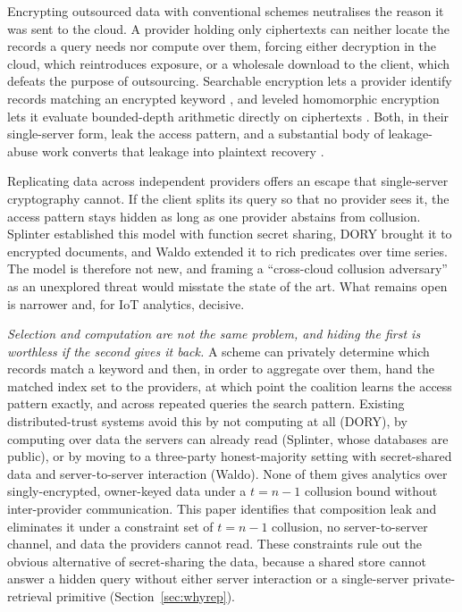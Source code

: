 \documentclass[a4paper,fleqn]{cas-sc}
\begin{document}
Encrypting outsourced data with conventional schemes neutralises the reason it
was sent to the cloud. A provider holding only ciphertexts can neither locate
the records a query needs nor compute over them, forcing either decryption in
the cloud, which reintroduces exposure, or a wholesale download to the client,
which defeats the purpose of outsourcing. Searchable encryption lets a
provider identify records matching an encrypted keyword
\citep{song2000practical,curtmola2006searchable,islam2023keyword}, and leveled
homomorphic encryption lets it evaluate bounded-depth arithmetic directly on
ciphertexts \citep{fan2012somewhat,cryptoeprint:2016/421}. Both, in their
single-server form, leak the access pattern, and a substantial body of
leakage-abuse work converts that leakage into plaintext recovery
\citep{islam2012access,cash2015leakage,grubbs2017leakage}.

Replicating data across independent providers offers an escape that
single-server cryptography cannot. If the client splits its query so that no
provider sees it, the access pattern stays hidden as long as one provider
abstains from collusion. Splinter \citep{splinter} established this model with
function secret sharing, DORY \citep{dory} brought it to encrypted documents,
and Waldo \citep{waldo} extended it to rich predicates over time series. The
model is therefore not new, and framing a ``cross-cloud collusion adversary''
as an unexplored threat would misstate the state of the art. What remains open
is narrower and, for IoT analytics, decisive.

\emph{Selection and computation are not the same problem, and hiding the first
is worthless if the second gives it back.} A scheme can privately determine
which records match a keyword and then, in order to aggregate over them, hand
the matched index set to the providers, at which point the coalition learns
the access pattern exactly, and across repeated queries the search pattern.
Existing distributed-trust systems avoid this by not computing at all (DORY),
by computing over data the servers can already read (Splinter, whose databases
are public), or by moving to a three-party honest-majority setting with
secret-shared data and server-to-server interaction (Waldo). None of them
gives analytics over singly-encrypted, owner-keyed data under a $t=n-1$
collusion bound without inter-provider communication. This paper identifies
that composition leak and eliminates it under a constraint set of $t=n-1$
collusion, no server-to-server channel, and data the providers cannot read.
These constraints rule out the obvious alternative of secret-sharing the
data, because a shared store cannot answer a hidden query without either
server interaction or a single-server private-retrieval primitive
(Section~\ref{sec:whyrep}).
\end{document}
